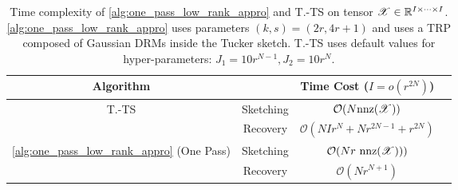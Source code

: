 \begin{table}[h!]
	\centering
	\begin{tabular}{c c c c }
		Algorithm  & & Time Cost ($I = o(r^{2N})$) \\
		\hline

		\multirow{2}{*}{T.-TS} & Sketching & $\mathcal{O}(N\rm{nnz}(\T{X}))$ \\
		& Recovery &  $\mathcal{O}(NIr^N+Nr^{2N-1}+r^{2N})$ & \\
		\hline\hline
		\multirow{2}{*}{\cref{alg:one_pass_low_rank_appro} (One Pass)} & Sketching &  $\mathcal{O}(Nr~ \rm{nnz}(\T{X})))$  \\
		& Recovery  & $\mathcal{O}(Nr^{N+1})$  \\
		\hline
	\end{tabular}
	\caption{Time complexity of \cref{alg:one_pass_low_rank_appro} and T.-TS
	on tensor $\T{X} \in \mathbb{R}^{I \times \dots \times I}$.
	\cref{alg:one_pass_low_rank_appro} uses parameters $(k,s) = (2r, 4r+1)$
	and uses a TRP composed of Gaussian DRMs inside the Tucker sketch.
	T.-TS uses default values for hyper-parameters: $J_1=10r^{N-1}, J_2=10r^{N}$.
	}
	\label{tab:time-comparison}
\end{table}


